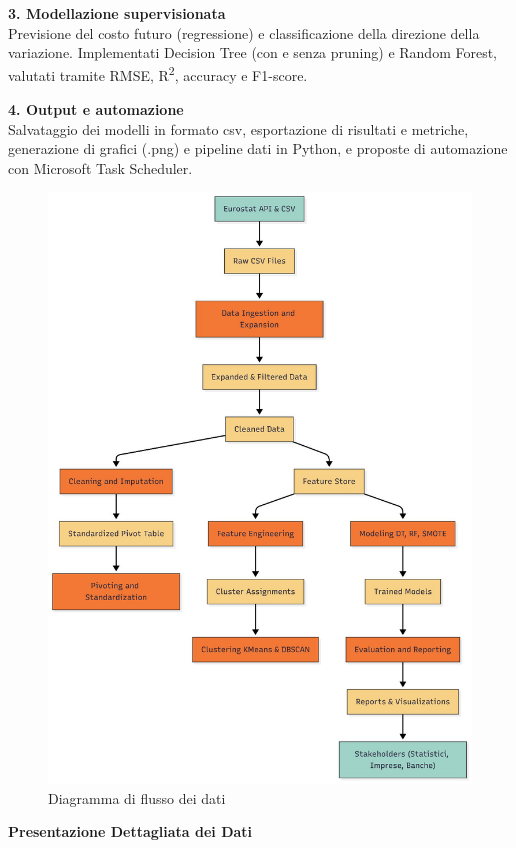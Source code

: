 \documentclass[conference]{IEEEtran}
\begin{document}
\vspace{1em}

{\large \textbf{3. Modellazione supervisionata}}\\
{\small Previsione del costo futuro (regressione) e classificazione della direzione della variazione. Implementati Decision Tree (con e senza pruning) e Random Forest, valutati tramite RMSE, R\textsuperscript{2}, accuracy e F1-score.}

\vspace{1em}

{\large \textbf{4. Output e automazione}}\\
{\small Salvataggio dei modelli in formato csv, esportazione di risultati e metriche, generazione di grafici (.png) e pipeline dati in Python, e proposte di automazione con Microsoft Task Scheduler.}

\begin{figure}[h]
  \centering
  \includegraphics[width=0.8\linewidth]{Data_Flow_Diagram.png}  
  \caption{Diagramma di flusso dei dati}
  \label{fig:dataflow}
\end{figure}

\vspace{1em}
{\Large\bfseries Presentazione Dettagliata dei Dati}
\vspace{0.5em}
     
\end{document}
